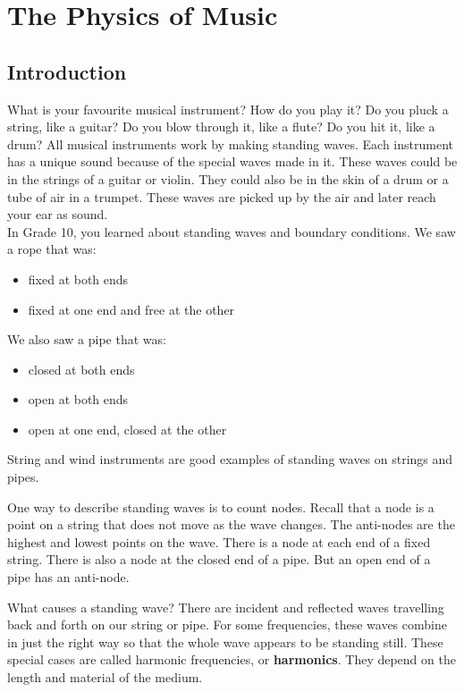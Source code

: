 \chapter{The Physics of Music}
\label{p:wsl:pm11}


\section{Introduction}
What is your favourite musical instrument? How do you play it? Do you pluck a string, like a guitar?
Do you blow through it, like a flute? Do you hit it, like a drum?
All musical instruments work by making standing waves. Each instrument has a unique sound because of the special waves made in it.
These waves could be in the strings of a guitar or violin.
They could also be in the skin of a drum or a tube of air in a trumpet.
These waves are picked up by the air and later reach your ear as sound.\\

In Grade 10, you learned about standing waves and boundary conditions. We saw a rope that was:
\begin{itemize}
\item{fixed at both ends}
\item{fixed at one end and free at the other}
\end{itemize}

We also saw a pipe that was:
\begin{itemize}
\item{closed at both ends}
\item{open at both ends}
\item{open at one end, closed at the other}
\end{itemize}

String and wind instruments are good examples of standing waves on strings and pipes.

One way to describe standing waves is to count nodes.
Recall that a node is a point on a string that does not move as the wave changes.
The anti-nodes are the highest and lowest points on the wave. There is a node at each end of a fixed string.
There is also a node at the closed end of a pipe.
But an open end of a pipe has an anti-node.

What causes a standing wave? There are incident and reflected waves travelling back and forth on our string or pipe.
For some frequencies, these waves combine in just the right way so that the whole wave appears to be standing still.
These special cases are called harmonic frequencies, or \textbf{harmonics}.
They depend on the length and material of the medium.


